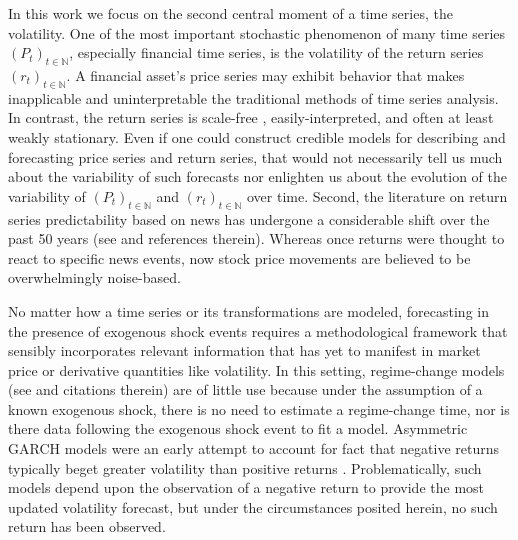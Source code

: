 \documentclass[11pt]{article}
\theoremstyle{definition}
\begin{document}
In this work we focus on the second central moment of a time series, the volatility.  One of the most important stochastic phenomenon of many time series $(P_{t})_{t\in\mathbb{N}}$, especially financial time series, is the volatility of the return series $(r_{t})_{t\in\mathbb{N}}$.  A financial asset's price series may exhibit behavior that makes inapplicable and uninterpretable the traditional methods of time series analysis.  In contrast, the return series is scale-free \citep{tsay2005analysis}, easily-interpreted, and often at least weakly stationary.  Even if one could construct credible models for describing and forecasting price series and return series, that would not necessarily tell us much about the variability of such forecasts nor enlighten us about the evolution of the variability of $(P_{t})_{t\in\mathbb{N}}$ and $(r_{t})_{t\in\mathbb{N}}$ over time.  Second, the literature on return series predictability based on news has undergone a considerable shift over the past 50 years (see \citet{boudoukh2019information} and references therein).  Whereas once returns were thought to react to specific news events, now stock price movements are believed to be overwhelmingly noise-based.

No matter how a time series or its transformations are modeled, forecasting in the presence of exogenous shock events requires a methodological framework that sensibly incorporates relevant information that has yet to manifest in market price or derivative quantities like volatility.  In this setting, regime-change models (see \citet{bauwens2006regime} and citations therein) are of little use because under the assumption of a known exogenous shock, there is no need to estimate a regime-change time, nor is there data following the exogenous shock event to fit a model.  Asymmetric GARCH models were an early attempt to account for fact that negative returns typically beget greater volatility than positive returns \citep{hansen2012realized}.  Problematically, such models depend upon the observation of a negative return to provide the most updated volatility forecast, but under the circumstances posited herein, no such return has been observed.
\end{document}
